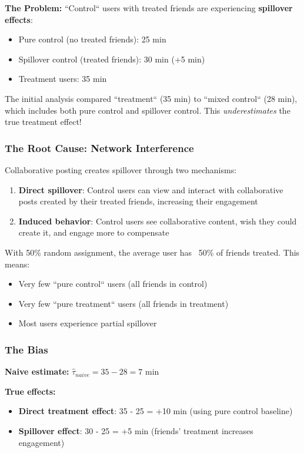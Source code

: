 \textbf{The Problem:} ``Control`` users with treated friends are experiencing \textbf{spillover effects}:
\begin{itemize}
    \item Pure control (no treated friends): 25 min
    \item Spillover control (treated friends): 30 min (+5 min)
    \item Treatment users: 35 min
\end{itemize}

The initial analysis compared ``treatment`` (35 min) to ``mixed control`` (28 min), which includes both pure control and spillover control. This \textit{underestimates} the true treatment effect!

\subsubsection{The Root Cause: Network Interference}

Collaborative posting creates spillover through two mechanisms:

\begin{enumerate}
    \item \textbf{Direct spillover}: Control users can view and interact with collaborative posts created by their treated friends, increasing their engagement
    \item \textbf{Induced behavior}: Control users see collaborative content, wish they could create it, and engage more to compensate
\end{enumerate}

With 50\% random assignment, the average user has ~50\% of friends treated. This means:
\begin{itemize}
    \item Very few ``pure control`` users (all friends in control)
    \item Very few ``pure treatment`` users (all friends in treatment)
    \item Most users experience partial spillover
\end{itemize}

\subsubsection{The Bias}

\textbf{Naive estimate:} $\hat{\tau}_{naive} = 35 - 28 = 7$ min

\textbf{True effects:}
\begin{itemize}
    \item \textbf{Direct treatment effect}: 35 - 25 = +10 min (using pure control baseline)
    \item \textbf{Spillover effect}: 30 - 25 = +5 min (friends' treatment increases engagement)
\end{itemize}


